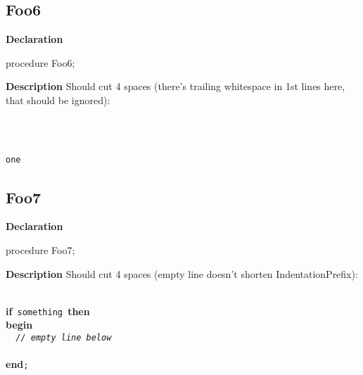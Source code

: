 \documentclass{report}
\begin{document}
\subsection*{Foo6}
\begin{list}{}{
\setlength{\itemindent}{0cm}
\setlength{\listparindent}{0cm}
\setlength{\leftmargin}{\evensidemargin}
\addtolength{\leftmargin}{\tmplength}
\settowidth{\labelsep}{X}
\addtolength{\leftmargin}{\labelsep}
\setlength{\labelwidth}{\tmplength}
}
\begin{flushleft}
\item[\textbf{Declaration}\hfill]
\begin{ttfamily}
procedure Foo6;\end{ttfamily}


\end{flushleft}
\par
\item[\textbf{Description}]
Should cut 4 spaces (there's trailing whitespace in 1st lines here, that should be ignored):

\texttt{\\\nopagebreak[3]
~~~~~~~~~~~~~~~~~\\\nopagebreak[3]
~~~~~~~~~~~~~~~~~~\\\nopagebreak[3]
one\\
}

\end{list}
\subsection*{Foo7}
\begin{list}{}{
\setlength{\itemindent}{0cm}
\setlength{\listparindent}{0cm}
\setlength{\leftmargin}{\evensidemargin}
\addtolength{\leftmargin}{\tmplength}
\settowidth{\labelsep}{X}
\addtolength{\leftmargin}{\labelsep}
\setlength{\labelwidth}{\tmplength}
}
\begin{flushleft}
\item[\textbf{Declaration}\hfill]
\begin{ttfamily}
procedure Foo7;\end{ttfamily}


\end{flushleft}
\par
\item[\textbf{Description}]
Should cut 4 spaces (empty line doesn't shorten IndentationPrefix):

\texttt{\\\nopagebreak[3]
}\textbf{if}\texttt{~something~}\textbf{then}\texttt{\\\nopagebreak[3]
}\textbf{begin}\texttt{\\\nopagebreak[3]
~~\textit{//~empty~line~below}\\\nopagebreak[3]
\\\nopagebreak[3]
}\textbf{end}\texttt{;\\
}

\end{list}
\end{document}
